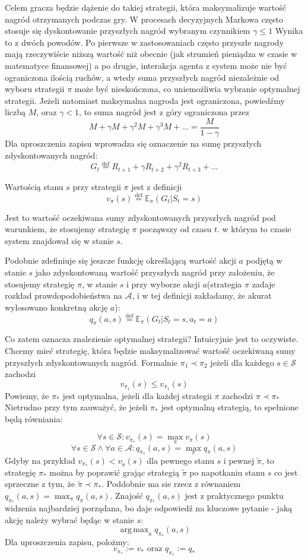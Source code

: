 \documentclass[licencjacka]{pracamgr}
\DeclareMathOperator*{\argmax}{arg\,max}
\begin{document}
Celem gracza będzie dążenie do takiej strategii, która maksymalizuje wartość nagród otrzymanych podczas gry.  W procesach decyzyjnych Markowa często stosuje się dyskontowanie przyszłych nagród wybranym czynnikiem $\gamma\leq1$ Wynika to z dwóch powodów. Po pierwsze w zastosowaniach często przyszłe nagrody mają rzeczywiście niższą wartość niż obecnie (jak strumień pieniądza w czasie w matematyce finansowej) a po drugie, interakcja agenta z system może nie być ograniczona ilością ruchów, a wtedy suma przyszłych nagród niezależnie od wyboru strategii $\pi$ może być nieskończona, co uniemożliwia wybranie optymalnej strategii. Jeżeli natomiast maksymalna nagroda jest ograniczona, powiedźmy liczbą $M$, oraz $\gamma<1$, to suma nagród jest z góry ograniczona przez
$$M+\gamma M +\gamma^{2}M+\gamma^{3}M+...  = \frac{M}{1-\gamma}$$
Dla uproszczenia zapisu wprowadza się oznaczenie na sumę przyszłych zdyskontowanych nagród:
$$G_{t} \stackrel{\text{def}}{=} R_{t+1} + \gamma R_{t+2} + \gamma^{2}R_{t+3} +...$$

Wartością stanu $s$ przy strategii $\pi$ jest z definicji 
$$v_{\pi}(s)\stackrel{\text{def}}{=} \mathbb{E}_{\pi}(G_{t}| S_{t} = s) $$

Jest to wartość oczekiwana sumy zdyskontowanych przyszłych nagród pod warunkiem, że stosujemy strategię $\pi$ począwszy od czasu $t$. w którym to czasie system znajdował się w stanie $s$. 

Podobnie zdefiniuje się jeszcze funkcję określającą wartość akcji $a$ podjętą w stanie $s$ jako zdyskontowaną wartość przyszłych nagród przy założeniu, że stosujemy strategię $\pi$, w stanie $s$ i przy wyborze akcji $a$(strategia $\pi$ zadaje rozkład prawdopodobieństwa na $\mathcal{A}$, i w tej definicji zakładamy, że akurat wylosowano konkretną akcję $a$):
$$q_{\pi}(a,s) \stackrel{\text{def}}{=} \mathbb{E}_{\pi}(G_{t}| S_{t} = s, a_{t} = a) $$

Co zatem oznacza znalezienie optymalnej strategii? Intuicyjnie jest to oczywiste. Chcemy mieć strategię, która będzie maksymalizować wartość oczekiwaną sumy przyszłych zdyskontowanych nagród. Formalnie $\pi_{1}\prec\pi_{2}$ jeżeli dla każdego $s\in\mathcal{S}$ zachodzi $$v_{\pi_{1}}(s)\leq v_{\pi_{1}}(s)$$
Powiemy, że $\pi_{*}$ jest optymalna, jeżeli dla każdej strategii $\pi$ zachodzi   $\pi\prec\pi_{*}$ Nietrudno przy tym zauważyć, że jeżeli $\pi_{*}$ jest optymalną strategią, to spełnione będą równiania:


$$\forall s\in \mathcal{S}: v_{\pi_{*}}(s) =\max_{\pi} v_{\pi}(s)$$ $$\forall s\in\mathcal{S}\wedge \forall a\in\mathcal{A}: q_{\pi_{*}}(a,s) = \max_{\pi} q_{\pi}(a,s)$$
Gdyby na przykład  $v_{\pi_{*}}(s)<v_{\tilde{\pi}}(s)$ dla pewnego stanu $s$ i  pewnej $\tilde{\pi}$, to  strategię $\pi_{*}$ można by poprawić grając strategią $\tilde{\pi}$ po napotkaniu stanu $s$ co jest sprzeczne z tym, że   $\tilde{\pi}\prec\pi_{*}$. Poddobnie ma sie rzecz z równaniem $q_{\pi_{*}}(a,s) = \max_{\pi} q_{\pi}(a,s)$.  Znajość $q_{\pi_{*}}(a,s)$ jest z praktycznego punktu widzenia najbardziej porządana, bo daje odpowiedź na kluczowe pytanie - jaką akcję należy wybrać będąc w stanie $s$:\\
$$\argmax_{a}q_{\pi_{*}}(a,s)$$
Dla uproszczenia zapisu, polożmy:
$$v_{\pi_{*}}:=v_{*}\text{ oraz } q_{\pi_{*}}:=q_{*}$$
\end{document}

